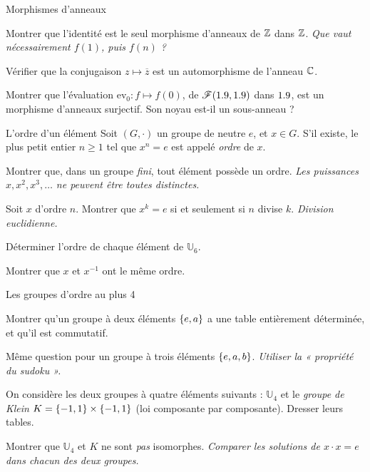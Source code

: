 \begin{exercice}[2]{Morphismes d'anneaux}
\begin{questions}
  \item Montrer que l'identité est le seul morphisme d'anneaux de $\mathbb{Z}$
    dans $\mathbb{Z}$. \emph{Que vaut nécessairement $f(1)$, puis $f(n)$ ?}
  \item Vérifier que la conjugaison $z\mapsto\overline{z}$ est un
    automorphisme de l'anneau $\mathbb{C}$.
  \item Montrer que l'évaluation $\mathrm{ev}_0:f\mapsto f(0)$, de
    $\mathscr{F}(1.9,1.9)$ dans $1.9$, est un morphisme d'anneaux surjectif.
    Son noyau est-il un sous-anneau ?
\end{questions}
\end{exercice}


\begin{exercice}[3]{L'ordre d'un élément}
Soit $(G,\cdot)$ un groupe de neutre $e$, et $x\in G$. S'il existe, le plus
petit entier $n\geq1$ tel que $x^{n}=e$ est appelé \emph{ordre} de $x$.
\begin{questions}
  \item Montrer que, dans un groupe \emph{fini}, tout élément possède un
    ordre. \emph{Les puissances $x,x^{2},x^{3},\dots$ ne peuvent être
    toutes distinctes.}
  \item Soit $x$ d'ordre $n$. Montrer que $x^{k}=e$ si et seulement si
    $n$ divise $k$. \emph{Division euclidienne.}
  \item Déterminer l'ordre de chaque élément de $\mathbb{U}_6$.
  \item Montrer que $x$ et $x^{-1}$ ont le même ordre.
\end{questions}
\end{exercice}

\begin{exercice}[3]{Les groupes d'ordre au plus 4}
\begin{questions}
  \item Montrer qu'un groupe à deux éléments $\left\{e,a\right\}$ a une table
    entièrement déterminée, et qu'il est commutatif.
  \item Même question pour un groupe à trois éléments $\left\{e,a,b\right\}$.
    \emph{Utiliser la « propriété du sudoku ».}
  \item On considère les deux groupes à quatre éléments suivants :
    $\mathbb{U}_4$ et le \emph{groupe de Klein}
    $K=\left\{-1,1\right\}\times\left\{-1,1\right\}$ (loi composante par composante).
    Dresser leurs tables.
  \item Montrer que $\mathbb{U}_4$ et $K$ ne sont \emph{pas} isomorphes.
    \emph{Comparer les solutions de $x\cdot x=e$ dans chacun des deux
    groupes.}
\end{questions}
\end{exercice}

